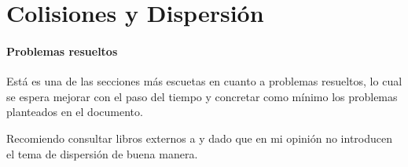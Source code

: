 \documentclass[/home/hernan/Documentos/Apuntes_mecanica_teorica/main.tex]{subfiles}
\begin{document}
    \part{Colisiones y Dispersión}



    \subsection{Problemas resueltos}
    Está es una de las secciones más escuetas en cuanto a problemas resueltos, lo cual se espera mejorar con el paso del tiempo y concretar como mínimo los problemas planteados en el documento.

    Recomiendo consultar libros externos a \cite{Taylor} y \cite{Thornton} dado que en mi opinión no introducen el tema de dispersión de buena manera.

    
\end{document}

